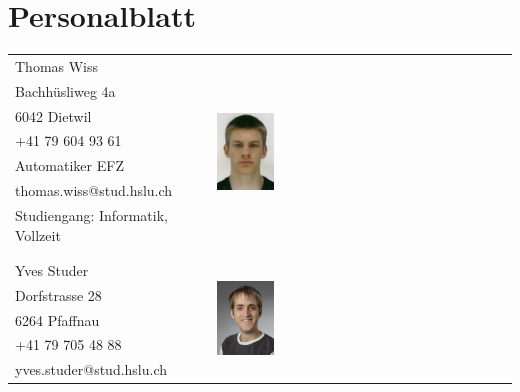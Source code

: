 
\section{Personalblatt}
  \begin{tabular}{lp{3.3cm}l}
    Thomas Wiss                                 & &  \multirow{8}{4cm}{\includegraphics[width=0.2\textwidth]{Sourcen/DasTeam/Bilder/ThomasWiss.jpg}} \\
    Bachhüsliweg 4a                             & &  \\
    6042 Dietwil                                & &  \\
    +41 79 604 93 61                            & &  \\
    Automatiker EFZ                             & &  \\
    thomas.wiss@stud.hslu.ch                 	& &  \\
    Studiengang: Informatik, Vollzeit           & &  \\
                                                & &  \\
                                                & &  \\
    Yves Studer                                 & &  \multirow{8}{4cm}{\includegraphics[width=0.2\textwidth]{Sourcen/DasTeam/Bilder/YvesStuder.jpg}} \\
    Dorfstrasse 28                              & &  \\
    6264 Pfaffnau                               & &  \\
    +41 79 705 48 88                            & &  \\
    yves.studer@stud.hslu.ch                    & &  \\

\end{tabular}
